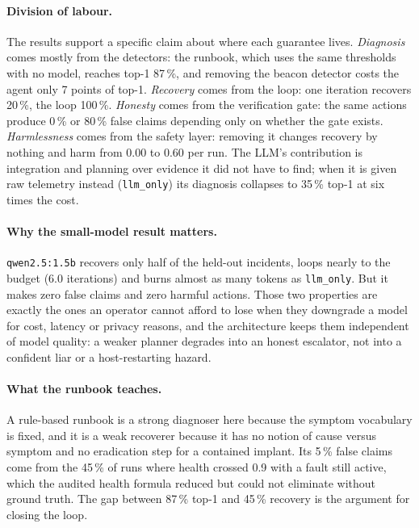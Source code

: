 \documentclass[11pt,a4paper]{article}
\newcommand{\code}[1]{\texttt{#1}}
\newcommand{\pct}[1]{#1\,\%}
\begin{document}
\paragraph{Division of labour.} The results support a specific claim about where each guarantee
lives. \emph{Diagnosis} comes mostly from the detectors: the runbook, which uses the same thresholds
with no model, reaches top-1 \pct{87}, and removing the beacon detector costs the agent only 7 points
of top-1. \emph{Recovery} comes from the loop: one iteration recovers \pct{20}, the loop \pct{100}.
\emph{Honesty} comes from the verification gate: the same actions produce \pct{0} or \pct{80} false
claims depending only on whether the gate exists. \emph{Harmlessness} comes from the safety layer:
removing it changes recovery by nothing and harm from 0.00 to 0.60 per run. The LLM's contribution
is integration and planning over evidence it did not have to find; when it is given raw telemetry
instead (\code{llm\_only}) its diagnosis collapses to \pct{35} top-1 at six times the cost.

\paragraph{Why the small-model result matters.} \code{qwen2.5:1.5b} recovers only half of the
held-out incidents, loops nearly to the budget (6.0 iterations) and burns almost as many tokens as
\code{llm\_only}. But it makes zero false claims and zero harmful actions. Those two properties are
exactly the ones an operator cannot afford to lose when they downgrade a model for cost, latency or
privacy reasons, and the architecture keeps them independent of model quality: a weaker planner
degrades into an honest escalator, not into a confident liar or a host-restarting hazard.

\paragraph{What the runbook teaches.} A rule-based runbook is a strong diagnoser here because the
symptom vocabulary is fixed, and it is a weak recoverer because it has no notion of cause versus
symptom and no eradication step for a contained implant. Its \pct{5} false claims come from the
\pct{45} of runs where health crossed 0.9 with a fault still active, which the audited health formula
reduced but could not eliminate without ground truth. The gap between \pct{87} top-1 and \pct{45}
recovery is the argument for closing the loop.
\end{document}
